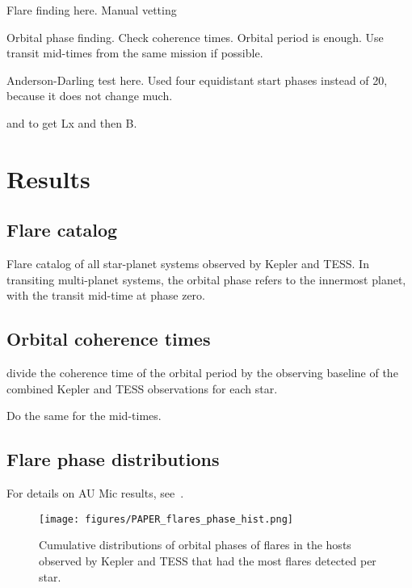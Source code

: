 \documentclass[twocolumn]{aastex631}
\begin{document}
Flare finding here. Manual vetting

Orbital phase finding. Check coherence times. Orbital period is enough.
Use transit mid-times from the same mission if possible.

Anderson-Darling test here. Used four equidistant start phases instead of 20, because it does not change much.

\cite{foster2022identifying} and \cite{reiners2022magnetism} to get Lx and then B.

\section{Results}
\label{sec:results}

\subsection{Flare catalog}

\begin{table*}
    \centering
            \caption{
            Flare catalog of all star-planet systems observed by Kepler and TESS. In transiting multi-planet systems, the orbital phase refers to the innermost planet, with the transit mid-time at phase zero. 
        }
    
        \label{fig:random_numbers}
\end{table*}

\subsection{Orbital coherence times}

divide the coherence time of the orbital period by the observing baseline of the combined Kepler and TESS observations for each star.

Do the same for the mid-times.

\subsection{Flare phase distributions}

For details on AU Mic results, see~\citep{ilin2022searching}.

\begin{figure*}[ht!]
    \begin{centering}
        \texttt{[image: figures/PAPER\_flares\_phase\_hist.png]}
        \caption{
            Cumulative distributions of orbital phases of flares in the hosts observed by Kepler and TESS that had the most flares detected per star.
        }
        \label{fig:cumdist_active}
    \end{centering}
\end{figure*}
\end{document}

